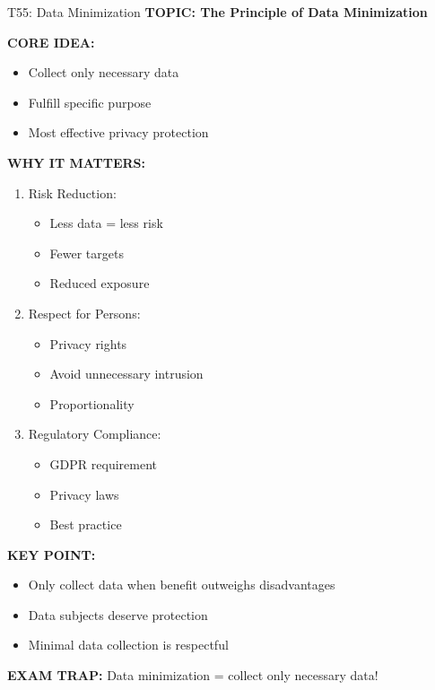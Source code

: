 \documentclass[8pt]{beamer}
\begin{document}
	\begin{frame}{T55: Data Minimization}
		\fontsize{6.5}{7.5}\selectfont
		\textbf{TOPIC: The Principle of Data Minimization}
		
		\vspace{0.1cm}
		\textbf{CORE IDEA:}
		\begin{itemize}
			\item Collect only necessary data
			\item Fulfill specific purpose
			\item Most effective privacy protection
		\end{itemize}
		
		\vspace{0.1cm}
		\textbf{WHY IT MATTERS:}
		\begin{enumerate}
			\item \textcolor{myblue}{Risk Reduction:}
			\begin{itemize}
				\item Less data = less risk
				\item Fewer targets
				\item Reduced exposure
			\end{itemize}
			\item \textcolor{myblue}{Respect for Persons:}
			\begin{itemize}
				\item Privacy rights
				\item Avoid unnecessary intrusion
				\item Proportionality
			\end{itemize}
			\item \textcolor{myblue}{Regulatory Compliance:}
			\begin{itemize}
				\item GDPR requirement
				\item Privacy laws
				\item Best practice
			\end{itemize}
		\end{enumerate}
		
		\vspace{0.1cm}
		\textbf{KEY POINT:}
		\begin{itemize}
			\item Only collect data when benefit outweighs disadvantages
			\item Data subjects deserve protection
			\item Minimal data collection is respectful
		\end{itemize}
		
		\textcolor{myred}{\textbf{EXAM TRAP:}} Data minimization = \textcolor{myblue}{collect only necessary data}!
	\end{frame}
	
\end{document}
